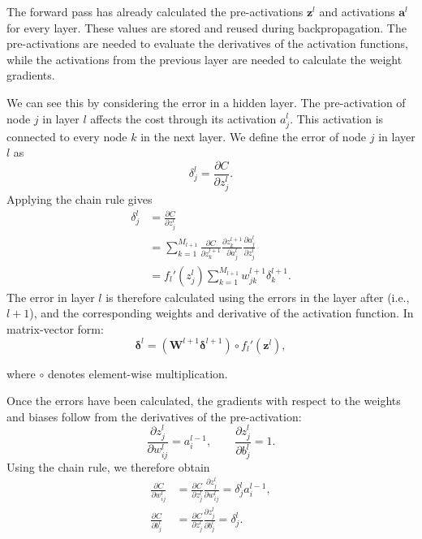 \documentclass[amssymb,secnumarabic,twocolumn,aps]{revtex4}
\begin{document}
The forward pass has already calculated the pre-activations $\boldsymbol{z}^l$ and activations $\boldsymbol{a}^l$ for every layer. These values are stored and reused during backpropagation. The pre-activations are needed to evaluate the derivatives of the activation functions, while the activations from the previous layer are needed to calculate the weight gradients.

We can see this by considering the error in a hidden layer. The pre-activation of node $j$ in layer $l$ affects the cost through its activation $a_j^l$. This activation is connected to every node $k$ in the next layer.  We define the error of node $j$ in layer $l$ as
\begin{equation*}
    \delta_j^l
    =\frac{\partial C}{\partial z_j^l}.
\end{equation*}
Applying the chain rule gives
\begin{align*}
    \delta_j^l
     & =\frac{\partial C}{\partial z_j^l} \\
     & =\sum_{k=1}^{M_{l+1}}
    \frac{\partial C}{\partial z_k^{l+1}}
    \frac{\partial z_k^{l+1}}{\partial a_j^l}
    \frac{\partial a_j^l}{\partial z_j^l} \\
     & =f_l'(z_j^l)
    \sum_{k=1}^{M_{l+1}}
    w_{jk}^{l+1}\delta_k^{l+1}.
\end{align*}
The error in layer $l$ is therefore calculated using the errors in the layer after (i.e., $l+1$), and the corresponding weights and derivative of the activation function. In matrix-vector form:
\begin{equation*}
    \boldsymbol{\delta}^l
    =
    \left(\boldsymbol{W}^{l+1}
    \boldsymbol{\delta}^{l+1}\right)
    \circ f_l'(\boldsymbol{z}^l),
\end{equation*}

where $\circ$ denotes element-wise multiplication.

Once the errors have been calculated, the gradients with respect to the weights and biases follow from the derivatives of the pre-activation:
\begin{equation*}
    \frac{\partial z_j^l}{\partial w_{ij}^l}
    =a_i^{l-1},
    \qquad
    \frac{\partial z_j^l}{\partial b_j^l}=1.
\end{equation*}
Using the chain rule, we therefore obtain
\begin{align*}
    \frac{\partial C}{\partial w_{ij}^l}
     & =\frac{\partial C}{\partial z_j^l}
    \frac{\partial z_j^l}{\partial w_{ij}^l}
    =\delta_j^l a_i^{l-1},                \\
    \frac{\partial C}{\partial b_j^l}
     & =\frac{\partial C}{\partial z_j^l}
    \frac{\partial z_j^l}{\partial b_j^l}
    =\delta_j^l.
\end{align*}
\end{document}
